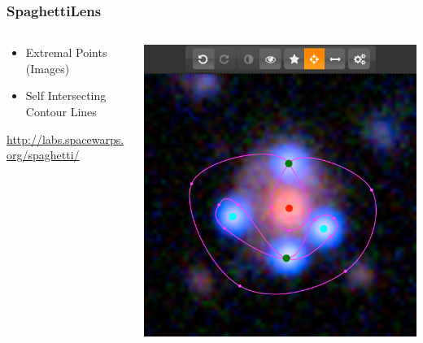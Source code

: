 \documentclass[aspectratio=1610]{beamer}
\begin{document}

 \begin{frame}
   \frametitle{SpaghettiLens}
 
   \begin{columns}[c]
   \begin{column}{0.5\textwidth}
     \begin{itemize}
       \item Extremal Points (Images)
       \item Self Intersecting Contour Lines
     \end{itemize}
     
     \footnotesize{\url{http://labs.spacewarps.org/spaghetti/}}
 
   \end{column}\begin{column}{0.5\textwidth}
     \includegraphics[width=\textwidth]{imgs/screenshot}
   \end{column}
   \end{columns}
 \end{frame}
\end{document}
